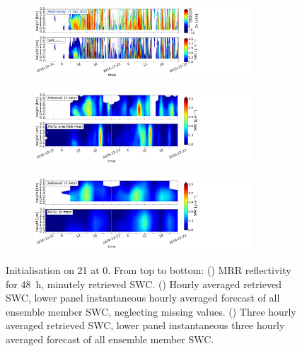 \begin{figure}[H]
	\centering
	\begin{subfigure}[t]{1.05\textwidth}
		\centering
		\includegraphics[trim={0.cm 2.2cm 19.cm 0.5cm},clip,width=0.9\textwidth]{./fig_obs_ret/20161221}
		\caption{}\label{fig:SWC:ret_21}
	\end{subfigure}
	\begin{subfigure}[t]{1.05\textwidth}
		\centering
		\includegraphics[trim={0.cm 2.2cm 19.cm 0.5cm},clip,width=0.9\textwidth]{./fig_vert_SWC_EM/20161221}
		\caption{}\label{fig:SWC_EM:21}
	\end{subfigure}
	\begin{subfigure}[t]{1.05\textwidth}
		\centering
		\includegraphics[trim={0.cm 0.8cm 19.cm 0.5cm},clip,width=0.9\textwidth]{./fig_vert_SWC_3h/20161221}
		\caption{}\label{fig:SWC3h:21}
	\end{subfigure}
	\caption{Initialisation on \SI{21}{\dec} at \SI{0}{\UTC}. From top to bottom: (\protect{}) MRR reflectivity for \SI{48}{\hour}, minutely retrieved SWC.
		(\protect{}) Hourly averaged retrieved SWC, lower panel instantaneous hourly averaged forecast of all ensemble member SWC, neglecting missing values. 
		(\protect{}) Three hourly averaged retrieved SWC, lower panel instantaneous three hourly averaged forecast of all ensemble member SWC.}\label{fig:SWC21}
\end{figure}
